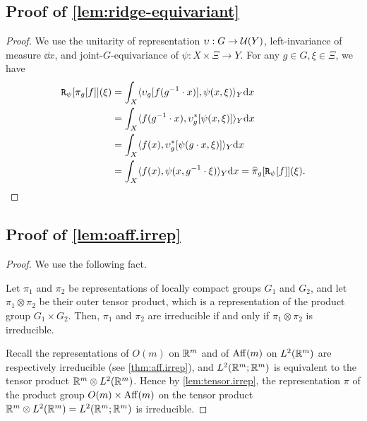 \subsection{{Proof of \cref{lem:ridge-equivariant}}} \label{sec:proof.ridge-equivariant}
\begin{proof}
We use the
unitarity of representation $\upsilon : G \to \mathcal{U}(Y)$, 
left-invariance of measure $\dd x$, and joint-$G$-equivariance of $\psi : X \times \Xi \to Y$. For any $g \in G, \xi \in \Xi$, we have
\begin{align*}
\mathtt{R}_\psi[\pi_g[f]](\xi) 
&= \int_X \langle \upsilon_g[ f(g^{-1} \cdot x) ], \psi(x,\xi) \rangle_Y \mathrm{d} x\\
&= \int_X \langle f(g ^{-1} \cdot x), \upsilon_g^*[\psi(x,\xi)] \rangle_Y \mathrm{d} x\\
&= \int_X \langle f(x), \upsilon_g^*[\psi(g \cdot x,\xi)] \rangle_Y \mathrm{d} x\\
&= \int_X \langle f(x), \psi(x,
g^{-1} \cdot \xi) \rangle_Y \mathrm{d} x
= \widehat{\pi}_g[\mathtt{R}_\psi[f]](\xi).    \qedhere
\end{align*}
\end{proof}

\subsection{{Proof of \cref{lem:oaff.irrep}}} \label{sec:proof.oaff.irrep}
\begin{proof}
We use the following fact.
\begin{lemma} \label{lem:tensor.irrep}
Let $\pi_1$ and $\pi_2$ be representations of locally compact groups $G_1$ and $G_2$, and let $\pi_1 \otimes \pi_2$ be their outer tensor product, which is a representation of the product group $G_1 \times G_2$.
Then, $\pi_1$ and $\pi_2$ are irreducible if and only if $\pi_1 \otimes \pi_2$ is irreducible.
\end{lemma}
Recall the representations of $O(m)$ on $\mathbb{R}^m$ and of $\operatorname{Aff}(m)$ on $L^2(\mathbb{R}^m)$ are respectively irreducible (see \cref{thm:aff.irrep}), and $L^2(\mathbb{R}^m;\mathbb{R}^m)$ is equivalent to the tensor product $\mathbb{R}^m \otimes L^2(\mathbb{R}^m)$. Hence by \cref{lem:tensor.irrep},
the representation $\pi$ of the product group $O(m) \times \operatorname{Aff}(m)$ on the tensor product $\mathbb{R}^m \otimes L^2(\mathbb{R}^m) = L^2(\mathbb{R}^m;\mathbb{R}^m)$ is irreducible.
\end{proof}

